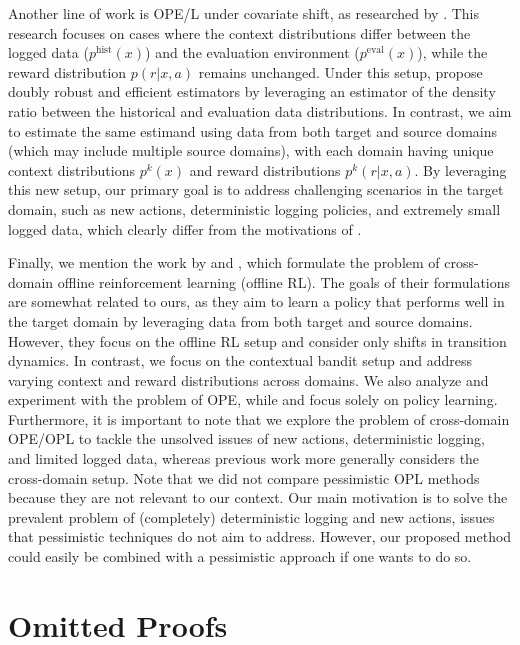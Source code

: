Another line of work is OPE/L under covariate shift, as researched by \cite{uehara2020off}. This research focuses on cases where the context distributions differ between the logged data ($p^{\text{hist}}(x)$) and the evaluation environment ($p^{\text{eval}}(x)$), while the reward distribution $p(r|x, a)$ remains unchanged. Under this setup, \cite{uehara2020off} propose doubly robust and efficient estimators by leveraging an estimator of the density ratio between the historical and evaluation data distributions. In contrast, we aim to estimate the same estimand using data from both target and source domains (which may include multiple source domains), with each domain having unique context distributions $p^k(x)$ and reward distributions $p^k(r|x, a)$. By leveraging this new setup, our primary goal is to address challenging scenarios in the target domain, such as new actions, deterministic logging policies, and extremely small logged data, which clearly differ from the motivations of \cite{uehara2020off}.

Finally, we mention the work by \cite{cief2024cross} and \cite{liu2024beyond}, which formulate the problem of cross-domain offline reinforcement learning (offline RL). The goals of their formulations are somewhat related to ours, as they aim to learn a policy that performs well in the target domain by leveraging data from both target and source domains. However, they focus on the offline RL setup and consider only shifts in transition dynamics. In contrast, we focus on the contextual bandit setup and address varying context and reward distributions across domains. We also analyze and experiment with the problem of OPE, while \cite{cief2024cross} and \cite{liu2024beyond} focus solely on policy learning. Furthermore, it is important to note that we explore the problem of cross-domain OPE/OPL to tackle the unsolved issues of new actions, deterministic logging, and limited logged data, whereas previous work more generally considers the cross-domain setup. Note that we did not compare pessimistic OPL methods~\citep{swaminathan2015counterfactual,london2019bayesian,gabbianelli2024importance,sakhi2024logarithmic} because they are not relevant to our context. Our main motivation is to solve the prevalent problem of (completely) deterministic logging and new actions, issues that pessimistic techniques do not aim to address. However, our proposed method could easily be combined with a pessimistic approach if one wants to do so.


\section{Omitted Proofs} \label{app:proof}

